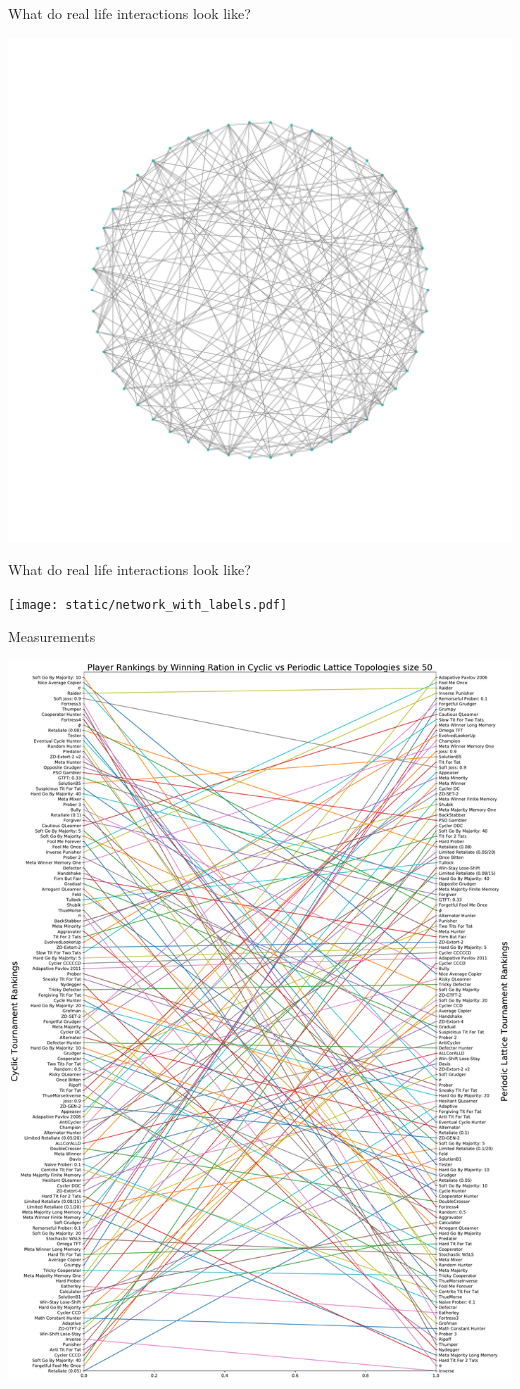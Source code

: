 \documentclass{beamer}
\begin{document}
\begin{frame}{What do real life interactions look like?}
\begin{center}
		\includegraphics[width=0.8\linewidth]{static/network_no_labels.pdf}
\end{center}
\end{frame}

\begin{frame}{What do real life interactions look like?}
\begin{center}
		\texttt{[image: static/network\_with\_labels.pdf]}
\end{center}
\end{frame}

\begin{frame}{Measurements}
	\begin{center}
		\includegraphics[width=0.55\linewidth]{static/winning_ratio.pdf}
	\end{center}
\end{frame}
\end{document}
